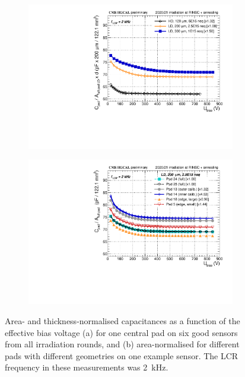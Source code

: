 \begin{figure}
	\captionsetup[subfigure]{aboveskip=-1pt,belowskip=-1pt}
	\centering
	\begin{subfigure}[b]{0.49\textwidth}
		\includegraphics[width=0.999\textwidth]{plots/channel_cv/channel_CV_sensors_sensors.pdf}
		\subcaption{
		}
		\label{plot:pad_CV_sensor}
	\end{subfigure}
	\hfill
	\begin{subfigure}[b]{0.49\textwidth}
		\includegraphics[width=0.999\textwidth]{plots/channel_cv/channel_CV_sensors_channels.pdf}
		\subcaption{
		}
		\label{plot:pad_CV_channels}
	\end{subfigure}
	\caption{
		Area- and thickness-normalised capacitances as a function of the effective bias voltage (a) for one central pad on six good sensors from all irradiation rounds, and (b) area-normalised for different pads with different geometries on one example sensor.
		The LCR frequency in these measurements was \SI{2}{\kilo\hertz}.
	}
\end{figure}

